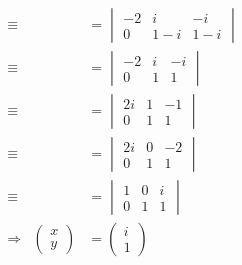 \documentclass[main.tex]{subfiles}
\begin{document}
\begin{align*}
\begin{array}{rrl}
		\equiv && = \begin{vmatrix}
		-2 & i & -i\\
		0 & 1-i & 1-i
		\end{vmatrix}\\[5mm]
		\equiv && = \begin{vmatrix}
			-2 & i & -i\\
			0 & 1 & 1
		\end{vmatrix}\\[5mm]
		\equiv && = \begin{vmatrix}
			2i & 1 & -1\\
			0 & 1 & 1
		\end{vmatrix}\\[5mm]
		\equiv && = \begin{vmatrix}
		2i & 0 & -2\\
		0 & 1 & 1
		\end{vmatrix}\\[5mm]
		\equiv && = \begin{vmatrix}
			1 & 0 & i\\
			0 & 1 & 1
		\end{vmatrix}\\[5mm]
		\Rightarrow & \begin{pmatrix}
			x\\
			y
		\end{pmatrix} & = \begin{pmatrix}
			i\\
			1
		\end{pmatrix}
	\end{array}
\end{align*}
\end{document}
